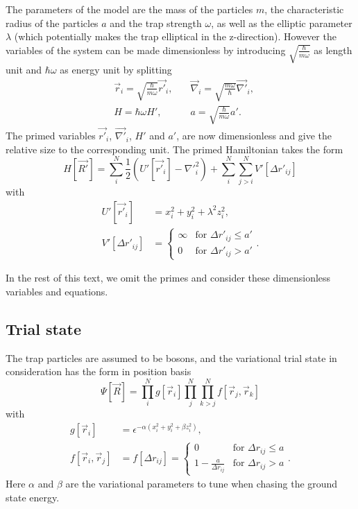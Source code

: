 \documentclass[a4paper,8pt]{article}
\begin{document}
\begin{multicols}{2}
The parameters of the model are the mass of the particles $m$, the characteristic radius of the particles $a$ and the trap strength $\omega$, as well as the elliptic parameter $\lambda$ (which potentially makes the trap elliptical in the z-direction). However the variables of the system can be made dimensionless by introducing $\sqrt{\frac{\hbar}{m\omega}}$ as length unit and $\hbar\omega$ as energy unit by splitting
\begin{align}
&\vec{r}_i = \sqrt{\frac{\hbar}{m\omega}}\vec{r'}_i, \quad &\vec{\nabla}_i = \sqrt{\frac{m\omega}{\hbar}}\vec{\nabla'}_i, \nonumber\\
&H = \hbar\omega H', \quad\quad &a = \sqrt{\frac{\hbar}{m\omega}}a'. \nonumber
\end{align}
The primed variables $\vec{r'}_i$, $\vec{\nabla'}_i$, $H'$ and $a'$, are now dimensionless and give the relative size to the corresponding unit. The primed Hamiltonian takes the form
\begin{equation}
H[\vec{R'}] = \sum\limits_i^N \frac{1}{2}\left( U'[\vec{r'}_i] - {\nabla'}_i^2\right) + \sum\limits_i^N\sum\limits_{j > i}^N V'[\Delta{r'}_{ij}] \label{Hamiltonian}
\end{equation}
with
\begin{align}
U'[\vec{r'}_i] &= x_i^2+y_i^2+\lambda^2z_i^2, \label{U}\\
V'[\Delta{r'}_{ij}] &=\begin{cases} \infty & \text{for $\Delta{r'}_{ij} \leq a'$} \\
0 & \text{for $\Delta{r'}_{ij} > a'$} \end{cases}. \label{V}
\end{align}

In the rest of this text, we omit the primes and consider these dimensionless variables and equations.

\subsection{Trial state} \label{trialstate}

The trap particles are assumed to be bosons, and the variational trial state in consideration has the form in position basis
\begin{equation}
\Psi[\vec{R}] = \prod\limits_i^N g[\vec{r}_i] \prod\limits_j^N\prod\limits_{k > j}^N f[\vec{r}_j,\vec{r}_k] \label{trialstate}
\end{equation}
with
\begin{align}
g[\vec{r}_i] &= \epsilon^{-\alpha\left(x_i^2+y_i^2+ \beta z_i^2\right)}, \\
f[\vec{r}_i,\vec{r}_j] &= f[\Delta{r}_{ij}] = \begin{cases} 0 & \text{for $\Delta{r}_{ij} \leq a$} \\
1-\frac{a}{\Delta{r}_{ij}} & \text{for $\Delta{r}_{ij} > a$} \end{cases}.
\end{align}
Here $\alpha$ and $\beta$ are the variational parameters to tune when chasing the ground state energy.



\end{multicols}
\end{document}
